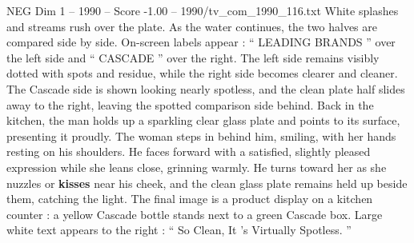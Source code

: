 \begin{textsample}{NEG Dim 1 – 1990 – Score -1.00 – 1990/tv\_com\_1990\_116.txt}
White splashes and streams rush over the plate.
As the water continues, the two halves are compared side by side.
On-screen labels appear : “ LEADING BRANDS ” over the left side and “ CASCADE ” over the right.
The left side remains visibly dotted with spots and residue, while the right side becomes clearer and cleaner.
The Cascade side is shown looking nearly spotless, and the clean plate half slides away to the right, leaving the spotted comparison side behind.
Back in the kitchen, the man holds up a sparkling clear glass plate and points to its surface, presenting it proudly.
The woman steps in behind him, smiling, with her hands resting on his shoulders.
He faces forward with a satisfied, slightly pleased expression while she leans close, grinning warmly.
He turns toward her as she nuzzles or \textbf{kisses} near his cheek, and the clean glass plate remains held up beside them, catching the light.
The final image is a product display on a kitchen counter : a yellow Cascade bottle stands next to a green Cascade box.
Large white text appears to the right : “ So Clean, It ’s Virtually Spotless. ”

\end{textsample}
